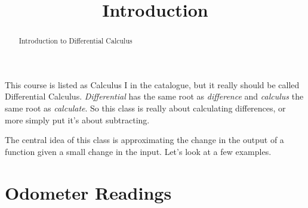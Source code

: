 \documentclass{ximera}
\title{Introduction}
\begin{document}
\begin{abstract}
Introduction to Differential Calculus
\end{abstract}
\maketitle


This course is listed as Calculus I in the catalogue, but it really should be called Differential Calculus. \emph{Differential} has the same root as \emph{difference} and \emph{calculus} the same root as \emph{calculate}. So this class is really about calculating differences, or more simply put it's about subtracting.

The central idea of this class is approximating the change in the output of a function given a small change in the input. Let's look at a few examples.

\section{Odometer Readings}
\end{document}
